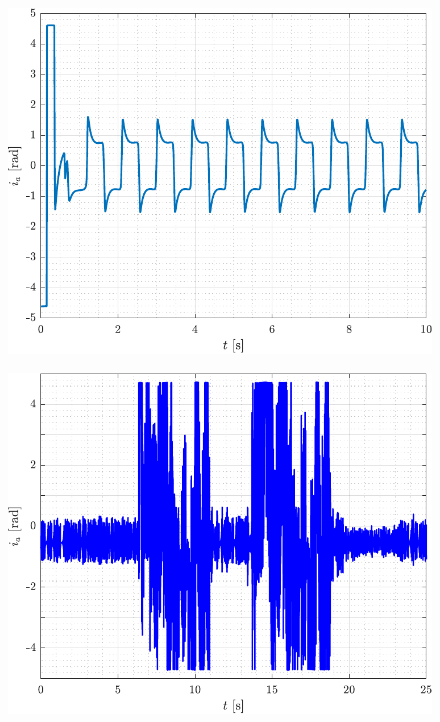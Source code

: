 \begin{figure}[H]
\includegraphics[width=.8\textwidth]{figures/slidingModeSIMia}
\end{figure}

\begin{figure}[H]
  \includegraphics[width=.8\textwidth]{figures/slidingModeTest2ia}
\end{figure}

